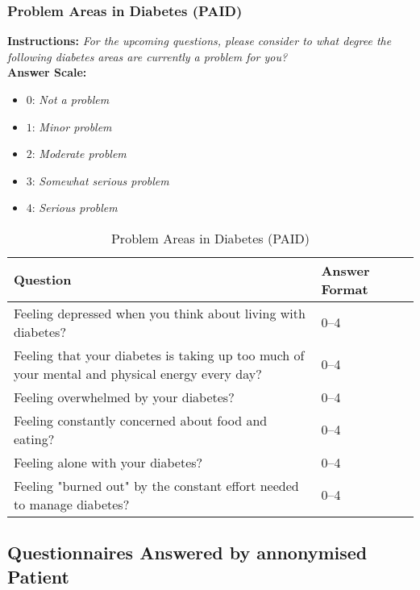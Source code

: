 \subsubsection{Problem Areas in Diabetes (PAID)}
\textbf{Instructions:} \emph{For the upcoming questions, please consider to what degree the following diabetes areas are currently a problem for you?}
\\
\textbf{Answer Scale:}
\begin{itemize}
    \item $0$: \emph{Not a problem}
    \item $1$: \emph{Minor problem}
    \item $2$: \emph{Moderate problem}
    \item $3$: \emph{Somewhat serious problem}
    \item $4$: \emph{Serious problem}
\end{itemize}
\begin{table}[H]
    \centering
    \renewcommand{\arraystretch}{1.2}
    \begin{tabularx}{\textwidth}{|l|X|l|}
        \hline
        \textbf{Question} & \textbf{Answer Format} \\ \hline
        Feeling depressed when you think about living with diabetes? & 0--4 \\ \hline
        Feeling that your diabetes is taking up too much of your mental and physical energy every day? & 0--4 \\ \hline
        Feeling overwhelmed by your diabetes? & 0--4 \\ \hline
        Feeling constantly concerned about food and eating? & 0--4 \\ \hline
        Feeling alone with your diabetes? & 0--4 \\ \hline
        Feeling "burned out" by the constant effort needed to manage diabetes? & 0--4 \\ \hline
    \end{tabularx}
    \caption{Problem Areas in Diabetes (PAID)}
    \label{tab:problem-areas-in-diabetes}
\end{table}


\newpage
\subsection{Questionnaires Answered by annonymised Patient}\label{sec:questionnaire-answers}
